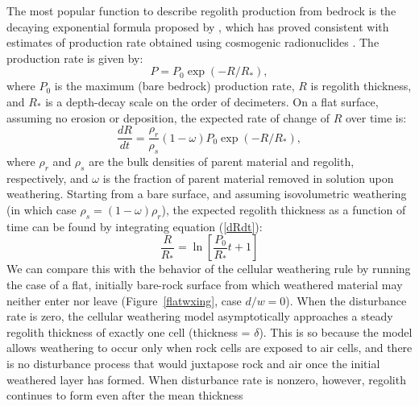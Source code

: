 \documentclass[esurf, manuscript]{copernicus}
\begin{document}
The most popular function to describe regolith production from bedrock is the decaying exponential formula proposed by \citet{ahnert1967role}, which has proved consistent with estimates of production rate obtained using cosmogenic radionuclides \citep{heimsath1997soil,small1999estimates}. The production rate is given by:
\begin{equation}
P = P_0 \exp \left( -R / R_* \right),
\end{equation}
where $P_0$ is the maximum (bare bedrock) production rate, $R$ is regolith thickness, and $R_*$ is a depth-decay scale on the order of decimeters. On a flat surface, assuming no erosion or deposition, the expected rate of change of $R$ over time is:
\begin{equation}
\frac{dR}{dt} = \frac{\rho_r}{\rho_s} (1-\omega ) P_0 \exp \left( -R / R_* \right),
\label{dRdt}
\end{equation}
where $\rho_r$ and $\rho_s$ are the bulk densities of parent material and regolith, respectively, and $\omega$ is the fraction of parent material removed in solution upon weathering. Starting from a bare surface, and assuming isovolumetric weathering (in which case $\rho_s = (1-\omega ) \rho_r$), the expected regolith thickness as a function of time can be found by integrating equation (\ref{dRdt}):
\begin{equation}
\frac{R}{R_*} = \ln \left[ \frac{P_0}{R_*} t + 1 \right]
\end{equation}
We can compare this with the behavior of the cellular weathering rule by running the case of a flat, initially bare-rock surface from which weathered material may neither enter nor leave (Figure~\ref{flatwxing}, case $d/w=0$). When the disturbance rate is zero, the cellular weathering model asymptotically approaches a steady regolith thickness of exactly one cell (thickness = $\delta$). This is so because the model allows weathering to occur only when rock cells are exposed to air cells, and there is no disturbance process that would juxtapose rock and air once the initial weathered layer has formed. When disturbance rate is nonzero, however, regolith continues to form even after the mean thickness %
\end{document}

